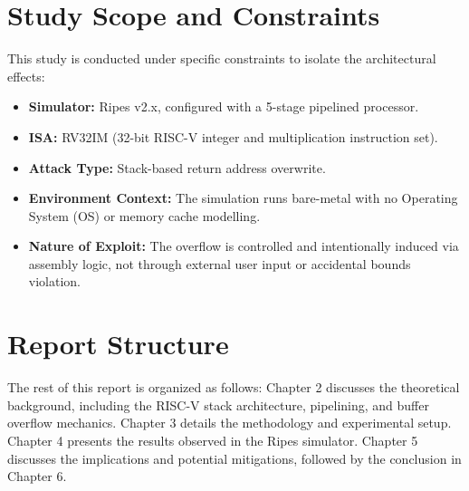 \section{Study Scope and Constraints}
This study is conducted under specific constraints to isolate the architectural effects:
\begin{itemize}
    \item \textbf{Simulator:} Ripes v2.x, configured with a 5-stage pipelined processor.
    \item \textbf{ISA:} RV32IM (32-bit RISC-V integer and multiplication instruction set).
    \item \textbf{Attack Type:} Stack-based return address overwrite.
    \item \textbf{Environment Context:} The simulation runs bare-metal with no Operating System (OS) or memory cache modelling.
    \item \textbf{Nature of Exploit:} The overflow is controlled and intentionally induced via assembly logic, not through external user input or accidental bounds violation.
\end{itemize}

\section{Report Structure}
The rest of this report is organized as follows: Chapter 2 discusses the theoretical background, including the RISC-V stack architecture, pipelining, and buffer overflow mechanics. Chapter 3 details the methodology and experimental setup. Chapter 4 presents the results observed in the Ripes simulator. Chapter 5 discusses the implications and potential mitigations, followed by the conclusion in Chapter 6.

